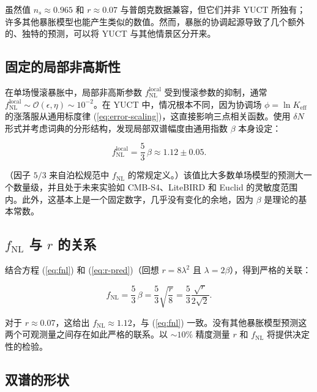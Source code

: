 \documentclass[12pt]{article}
\theoremstyle{remark}
\newcommand{\Keff}{K_{\mathrm{eff}}}
\begin{document}
	虽然值 $n_s \approx 0.965$ 和 $r \approx 0.07$ 与普朗克数据兼容，但它们并非 YUCT 所独有；许多其他暴胀模型也能产生类似的数值。然而，暴胀的协调起源导致了几个额外的、独特的预测，可以将 YUCT 与其他情景区分开来。
	
	\subsection{固定的局部非高斯性}
	
	在单场慢滚暴胀中，局部非高斯参数 $f_{\text{NL}}^{\text{local}}$ 受到慢滚参数的抑制，通常 $f_{\text{NL}}^{\text{local}} \sim \mathcal{O}(\epsilon, \eta) \sim 10^{-2}$。在 YUCT 中，情况根本不同，因为协调场 $\phi = \ln \Keff$ 的涨落服从通用标度律 (\ref{eq:error-scaling})，这直接影响三点相关函数。使用 $\delta N$ 形式并考虑词典的分形结构，发现局部双谱幅度由通用指数 $\beta$ 本身设定：
	
	\begin{equation}
		f_{\text{NL}}^{\text{local}} = \frac{5}{3}\,\beta \approx 1.12 \pm 0.05.
		\label{eq:fnl}
	\end{equation}
	
	（因子 $5/3$ 来自泊松规范中 $f_{\text{NL}}$ 的常规定义。）该值比大多数单场模型的预测大一个数量级，并且处于未来实验如 CMB‑S4、LiteBIRD 和 Euclid 的灵敏度范围内。此外，这基本上是一个固定数字，几乎没有变化的余地，因为 $\beta$ 是理论的基本常数。
	
	\subsection{$f_{\text{NL}}$ 与 $r$ 的关系}
	
	结合方程 (\ref{eq:fnl}) 和 (\ref{eq:r-pred})（回想 $r = 8\lambda^2$ 且 $\lambda = 2\beta$），得到严格的关联：
	
	\begin{equation}
		f_{\text{NL}} = \frac{5}{3}\,\beta = \frac{5}{3}\sqrt{\frac{r}{8}} = \frac{5}{3}\frac{\sqrt{r}}{2\sqrt{2}}.
		\label{eq:fnl-r}
	\end{equation}
	
	对于 $r \approx 0.07$，这给出 $f_{\text{NL}} \approx 1.12$，与 (\ref{eq:fnl}) 一致。没有其他暴胀模型预测这两个可观测量之间存在如此严格的联系。以 $\sim 10\%$ 精度测量 $r$ 和 $f_{\text{NL}}$ 将提供决定性的检验。
	
	\subsection{双谱的形状}
	
\end{document}
